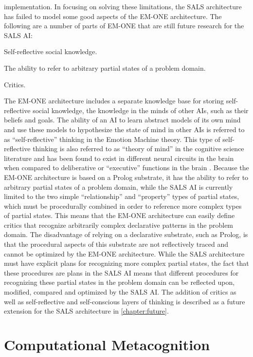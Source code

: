 implementation.  In focusing on solving these limitations, the SALS
architecture has failed to model some good aspects of the EM-ONE
architecture.  The following are a number of parts of EM-ONE that are
still future research for the SALS AI:
\begin{packed_enumerate}
\item{Self-reflective social knowledge.}
\item{The ability to refer to arbitrary partial states of a problem
  domain.}
\item{Critics.}
\end{packed_enumerate}
The EM-ONE architecture includes a separate knowledge base for storing
self-reflective social knowledge, the knowledge in the minds of other
AIs, such as their beliefs and goals.  The ability of an AI to learn
abstract models of its own mind and use these models to hypothesize
the state of mind in other AIs is referred to as ``self-reflective''
thinking in the Emotion Machine theory.  This type of self-reflective
thinking is also referred to as ``theory of mind'' in the cognitive
science literature and has been found to exist in different neural
circuits in the brain when compared to deliberative or ``executive''
functions in the brain \cite[]{saxe:2006}.  Because the EM-ONE
architecture is based on a Prolog substrate, it has the ability to
refer to arbitrary partial states of a problem domain, while the SALS
AI is currently limited to the two simple ``relationship'' and
``property'' types of partial states, which must be procedurally
combined in order to reference more complex types of partial states.
This means that the EM-ONE architecture can easily define critics that
recognize arbitrarily complex declarative patterns in the problem
domain.  The disadvantage of relying on a declarative substrate, such
as Prolog, is that the procedural aspects of this substrate are not
reflectively traced and cannot be optimized by the EM-ONE
architecture.  While the SALS architecture must have explicit plans
for recognizing more complex partial states, the fact that these
procedures are plans in the SALS AI means that different procedures
for recognizing these partial states in the problem domain can be
reflected upon, modified, compared and optimized by the SALS AI.  The
addition of critics as well as self-reflective and self-conscious
layers of thinking is described as a future extension for the SALS
architecture in {\mbox{\autoref{chapter:future}}}.

\section{Computational Metacognition}

